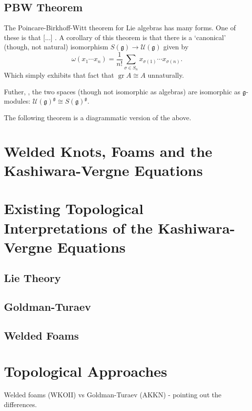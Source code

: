 \documentclass[12pt]{report}
\theoremstyle{regular}
\newcommand{\scaffold}[1]{
\begin{mdframed}[style=scaffold]
        {\color{teal}#1}
\end{mdframed}
}
\begin{document}
        \section{PBW Theorem}

        \scaffold{The Poincare-Birkhoff-Witt theorem for Lie algebras has many forms. One of these is that [...] . A corollary of this theorem \cite{enveloping-algebras} is that there is a `canonical' (though, not natural) isomorphism \(S(\mathfrak{g}) \to \mathcal{U}(\mathfrak{g})\) given by \[\omega(x_{1} \cdots x_{n}) = \frac{1}{n!} \sum_{\sigma \in S_{n}} x_{\sigma(1)} \cdots x_{\sigma(n)}.\] Which simply exhibits that fact that \(\operatorname{gr} A \cong A\) unnaturally.}

        \scaffold{Futher, \cite{enveloping-algebras}, the two spaces (though not isomorphic as algebras) are isomorphic as \(\mathfrak{g}\)-modules: \(\mathcal{U}(\mathfrak{g})^{\mathfrak{g}} \cong S(\mathfrak{g})^{\mathfrak{g}}\).}

        \scaffold{The following theorem is a diagrammatic version of the above.}

        \chapter{Welded Knots, Foams and the Kashiwara-Vergne Equations}

        \chapter{Existing Topological Interpretations of the Kashiwara-Vergne Equations}

        \section{Lie Theory}

        \section{Goldman-Turaev}

        \section{Welded Foams}

        \chapter{Topological Approaches}
        \scaffold{Welded foams (WKOII) vs Goldman-Turaev (AKKN) - pointing out the differences.}
\end{document}
